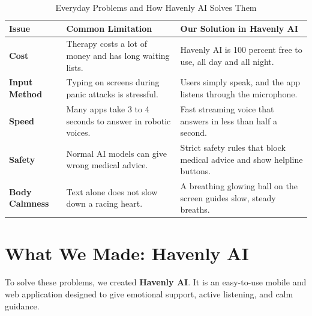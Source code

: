 \begin{table}[ht]
\centering
\caption{Everyday Problems and How Havenly AI Solves Them}
\label{tab:problem_solution_matrix}
\begin{tabularx}{\textwidth}{lXX}
\toprule
\textbf{Issue} & \textbf{Common Limitation} & \textbf{Our Solution in Havenly AI} \\
\midrule
\textbf{Cost} & Therapy costs a lot of money and has long waiting lists. & Havenly AI is 100 percent free to use, all day and all night. \\
\textbf{Input Method} & Typing on screens during panic attacks is stressful. & Users simply speak, and the app listens through the microphone. \\
\textbf{Speed} & Many apps take 3 to 4 seconds to answer in robotic voices. & Fast streaming voice that answers in less than half a second. \\
\textbf{Safety} & Normal AI models can give wrong medical advice. & Strict safety rules that block medical advice and show helpline buttons. \\
\textbf{Body Calmness} & Text alone does not slow down a racing heart. & A breathing glowing ball on the screen guides slow, steady breaths. \\
\bottomrule
\end{tabularx}
\end{table}

\section{What We Made: Havenly AI}
\label{sec:intro_proposed_platform}

To solve these problems, we created \textbf{Havenly AI}. It is an easy-to-use mobile and web application designed to give emotional support, active listening, and calm guidance. 

